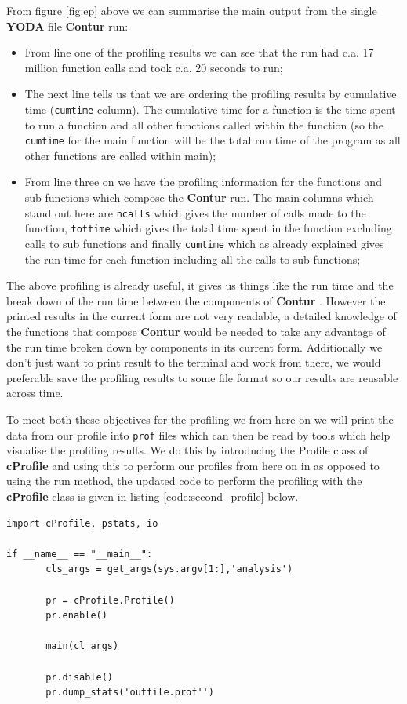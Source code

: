 From figure \ref{fig:ep} above we can summarise the main output from the single \textbf{YODA} file \textbf{Contur} run:

\begin{itemize}
\item From line one of the profiling results we can see that the run had c.a. 17 million function calls and took c.a. 20 seconds to run;
\item The next line tells us that we are ordering the profiling results by cumulative time (\texttt{cumtime} column). The cumulative time for a function is the time spent to run a function and all other functions called within the function (so the \texttt{cumtime} for the main function will be the total run time of the program as all other functions are called within main);
\item From line three on we have the profiling information for the functions and sub-functions which compose the \textbf{Contur}  run. The main columns which stand out here are \texttt{ncalls} which gives the number of calls made to the function, \texttt{tottime} which gives the total time spent in the function excluding calls to sub functions and finally \texttt{cumtime} which as already explained gives the run time for each function including all the calls to sub functions;
\end{itemize}

The above profiling is already useful, it gives us things like the run time and the break down of the run time between the components of \textbf{Contur} . However the printed results in the current form are not very readable, a detailed knowledge of the functions that compose \textbf{Contur} would be needed to take any advantage of the run time broken down by components in its current form. Additionally we don't just want to print result to the terminal and work from there, we would preferable save the profiling results to some file format so our results are reusable across time. 

To meet both these objectives for the profiling we  from here on we will print the data from our profile into \texttt{prof} files which can then be read by tools which help visualise the profiling results. We do this by introducing the Profile class of \textbf{cProfile} and using this to perform our profiles from here on in as opposed to using the run method, the updated code to perform the profiling with the \textbf{cProfile} class is given in listing \ref{code:second_profile} below.

\begin{code}
\label{code:second_profile}
\begin{verbatim}
import cProfile, pstats, io

if __name__ == "__main__":
       cls_args = get_args(sys.argv[1:],'analysis')
       
       pr = cProfile.Profile()
       pr.enable()
       
       main(cl_args)
       
       pr.disable()
       pr.dump_stats('outfile.prof'')
\end{verbatim}
\end{code}


